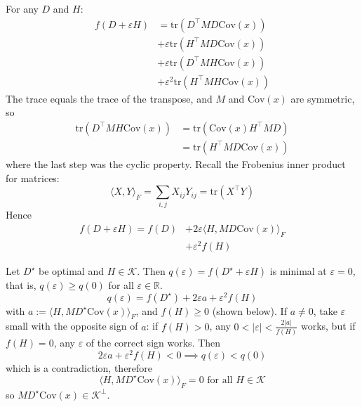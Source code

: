 \documentclass[10pt,a4paper,twocolumn]{article}
\newcommand{\R}{\mathbb{R}}
\begin{document}
	For any $D$ and $H$:
	$$\begin{aligned}
		f(D + \varepsilon H) & = \mathrm{tr} \left( D^\top M D \mathrm{Cov}(x) \right) \\
		& + \varepsilon \mathrm{tr} \left( H^\top M D \mathrm{Cov}(x) \right) \\
		& + \varepsilon \mathrm{tr} \left( D^\top M H \mathrm{Cov}(x) \right) \\
		& + \varepsilon^2 \mathrm{tr} \left( H^\top M H \mathrm{Cov}(x) \right)
	\end{aligned}$$
	The trace equals the trace of the transpose, and $M$ and $\mathrm{Cov}(x)$ are symmetric, so
	$$\begin{aligned}
		\mathrm{tr} \left( D^\top M H \mathrm{Cov}(x) \right) & = \mathrm{tr} \left( \mathrm{Cov}(x) H^\top M D \right) \\
		& = \mathrm{tr} \left( H^\top M D \mathrm{Cov}(x) \right)
	\end{aligned}$$
	where the last step was the cyclic property. Recall the Frobenius inner product for matrices:
	$$\langle X, Y \rangle_F = \sum_{i, j} X_{ij} Y_{ij} = \mathrm{tr}(X^\top Y)$$
	Hence
	$$\begin{aligned}
		f(D + \varepsilon H) = f(D) & + 2 \varepsilon \langle H, M D \mathrm{Cov}(x) \rangle_F \\
		& + \varepsilon^2 f(H)
	\end{aligned}$$

	Let $D^\star$ be optimal and $H \in \mathcal{K}$. Then $q(\varepsilon) = f(D^\star + \varepsilon H)$ is minimal at $\varepsilon = 0$, that is, $q(\varepsilon) \ge q(0)$ for all $\varepsilon \in \R$.
	$$q(\varepsilon) = f(D^\star) + 2 \varepsilon a + \varepsilon^2 f(H)$$
	with $a := \langle H, M D^\star \mathrm{Cov}(x) \rangle_F$, and $f(H) \ge 0$ (shown below). If $a \ne 0$, take $\varepsilon$ small with the opposite sign of $a$: if $f(H) > 0$, any $0 < |\varepsilon| < \frac{2 |a|}{f(H)}$ works, but if $f(H) = 0$, any $\varepsilon$ of the correct sign works. Then
	$$2 \varepsilon a + \varepsilon^2 f(H) < 0 \implies q(\varepsilon) < q(0)$$
	which is a contradiction, therefore
	$$\langle H, M D^\star \mathrm{Cov}(x) \rangle_F = 0 \text{ for all } H \in \mathcal{K}$$
	so $M D^\star \mathrm{Cov}(x) \in \mathcal{K}^\perp$.
\end{document}

